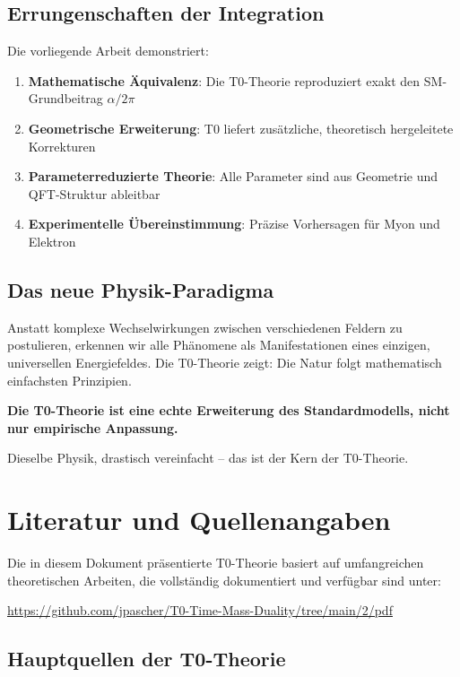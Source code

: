 \documentclass[12pt,a4paper]{article}
\numberwithin{equation}{section}
\begin{document}
	\subsection{Errungenschaften der Integration}
	
	Die vorliegende Arbeit demonstriert:
	
	\begin{enumerate}
		\item \textbf{Mathematische Äquivalenz}: Die T0-Theorie reproduziert exakt den SM-Grundbeitrag $\alpha/2\pi$
		\item \textbf{Geometrische Erweiterung}: T0 liefert zusätzliche, theoretisch hergeleitete Korrekturen
		\item \textbf{Parameterreduzierte Theorie}: Alle Parameter sind aus Geometrie und QFT-Struktur ableitbar
		\item \textbf{Experimentelle Übereinstimmung}: Präzise Vorhersagen für Myon und Elektron
	\end{enumerate}
	
	\subsection{Das neue Physik-Paradigma}
	
	Anstatt komplexe Wechselwirkungen zwischen verschiedenen Feldern zu postulieren, erkennen wir alle Phänomene als Manifestationen eines einzigen, universellen Energiefeldes. Die T0-Theorie zeigt: Die Natur folgt mathematisch einfachsten Prinzipien.
	
	\textbf{Die T0-Theorie ist eine echte Erweiterung des Standardmodells, nicht nur empirische Anpassung.}
	
	Dieselbe Physik, drastisch vereinfacht -- das ist der Kern der T0-Theorie.
	

	
	\section{Literatur und Quellenangaben}
	
	Die in diesem Dokument präsentierte T0-Theorie basiert auf umfangreichen theoretischen Arbeiten, die vollständig dokumentiert und verfügbar sind unter:
	
	\begin{center}
		\url{https://github.com/jpascher/T0-Time-Mass-Duality/tree/main/2/pdf}
	\end{center}
	
	\subsection{Hauptquellen der T0-Theorie}
	
\end{document}
